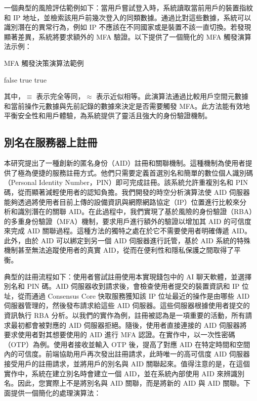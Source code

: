 一個典型的風險評估範例如下：當用戶嘗試登入時，系統讀取當前用戶的裝置指紋和 IP 地址，並檢索該用戶前幾次登入的同類數據。通過比對這些數據，系統可以識別潛在的異常行為，例如 IP 不應該在不同國家或是裝置不該一直切換。若發現顯著差異，系統將要求額外的 MFA 驗證。以下提供了一個簡化的 MFA 觸發演算法示例：

\begin{algorithm}
  \caption{MFA 觸發決策演算法範例}
  \begin{algorithmic}[1]
    \State \Return false
    \Else
    \State \Return true
    \EndIf
    \EndIf
    \State \Return true
    \EndFunction
  \end{algorithmic}
\end{algorithm}

其中，$\equiv$ 表示完全等同，$\approx$ 表示近似相等。此演算法通過比較用戶空間元數據和當前操作元數據與先前記錄的數據來決定是否需要觸發 MFA。此方法能有效地平衡安全性和用戶體驗，為系統提供了靈活且強大的身份驗證機制。

\subsection{別名在服務器上註冊}




本研究提出了一種創新的匿名身份（AID）註冊和關聯機制。這種機制為使用者提供了極為便捷的服務註冊方式。他們只需要定義首選別名和簡單的數位個人識別碼（Personal Identity Number，PIN）即可完成註冊。該系統允許重複別名和 PIN 碼，從而顯著減輕使用者的認知負擔。我們開發的時空分析演算法使 AID 伺服器能夠透過將使用者目前上傳的設備資訊與網際網路協定（IP）位置進行比較來分析和識別潛在的關聯 AID。在此過程中，我們實現了基於風險的身份驗證（RBA）的多重身份驗證（MFA）機制，要求用戶進行額外的驗證以增加其 AID 的可信度來完成 AID 關聯過程。這種方法的獨特之處在於它不需要使用者明確傳遞 AID。此外，由於 AID 可以綁定到另一個 AID 伺服器進行託管，基於 AID 系統的特殊機制甚至無法追蹤使用者的真實 AID，從而在便利性和隱私保護之間取得了平衡。


典型的註冊流程如下：使用者嘗試註冊使用本實現錢包中的 AI 聊天軟體，並選擇別名和 PIN 碼。AID 伺服器收到請求後，會檢查使用者提交的裝置資訊和 IP 位址，從而通過 Consensus Core 快取服務獲知該 IP 位址最近的操作是由哪些 AID 伺服器管理的，然後發布請求給這些 AID 伺服器。這些伺服器根據使用者提交的資訊執行 RBA 分析。以我們的實作為例，註冊被認為是一項重要的活動，所有請求最初都會被對應的 AID 伺服器拒絕。隨後，使用者直接連接的 AID 伺服器將要求使用者對其想要使用的 AID 進行 MFA 認證。在實作中，以一次性密碼（OTP）為例。使用者接收並輸入 OTP 後，提高了對應 AID 在特定時間和空間內的可信度。前端協助用戶再次發出註冊請求，此時唯一的高可信度 AID 伺服器接受用戶的註冊請求，並將用戶的別名與 AID 關聯起來。值得注意的是，在這個實作中，系統在建立別名時會建立一個 AID，並在系統內部使用 AID 來辨識別名。因此，您實際上不是將別名與 AID 關聯，而是將新的 AID 與 AID 關聯。下面提供一個簡化的處理演算法：

